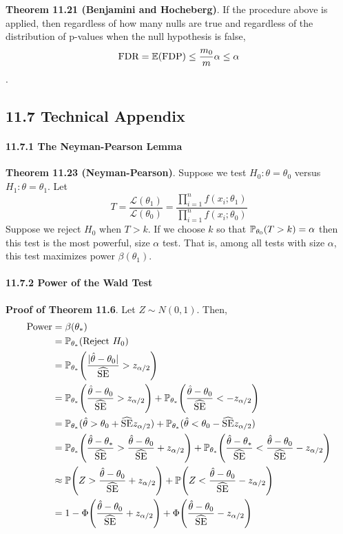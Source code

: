\textbf{Theorem 11.21 (Benjamini and Hocheberg)}. If the procedure above
is applied, then regardless of how many nulls are true and regardless of
the distribution of p-values when the null hypothesis is false,
\[
\text{FDR} = \operatorname{\mathbb{E}}(\text{FDP}) \leq \frac{m_{0}}{m} \alpha \leq \alpha
\].

\subsection*{11.7 Technical Appendix}
\paragraph{11.7.1 The Neyman-Pearson
Lemma}\label{the-neyman-pearson-lemma}

\textbf{Theorem 11.23 (Neyman-Pearson)}. Suppose we test
\(H_{0}: \theta = \theta_{0}\) versus \(H_{1}: \theta = \theta_{1}\). Let
\[
T = \frac{\mathcal{L}(\theta_{1})}{\mathcal{L}(\theta_{0})} = \frac{\prod_{i=1}^{n} f(x_{i}; \theta_{1})}{\prod_{i=1}^{n} f(x_{i}; \theta_{0})}
\]
Suppose we reject \(H_{0}\) when \(T > k\). If we choose \(k\) so that
\(\operatorname{\mathbb{P}}_{\theta_{0}}(T > k) = \alpha\) then this test is the most
powerful, size \(\alpha\) test. That is, among all tests with size
\(\alpha\), this test maximizes power \(\beta(\theta_{1})\).
\paragraph{11.7.2 Power of the Wald Test}\label{power-of-the-wald-test}
\textbf{Proof of Theorem 11.6}.
Let \(Z \sim N(0, 1)\). Then,
\begin{align*}
\text{Power} &= \beta(\theta_{*}) \\
&= \PROB_{\theta_{*}}(\text{Reject } H_{0}) \\
&= \PROB_{\theta_{*}}\left( \frac{|\hat{\theta} - \theta_{0}|}{\widehat{\SE}} > z_{\alpha/2} \right) \\
&= \PROB_{\theta_{*}}\left( \frac{\hat{\theta} - \theta_{0}}{\widehat{\SE}} > z_{\alpha/2} \right) 
+ \PROB_{\theta_{*}}\left( \frac{\hat{\theta} - \theta_{0}}{\widehat{\SE}} < -z_{\alpha/2} \right) \\
&= \PROB_{\theta_{*}}(\hat{\theta} > \theta_{0} + \widehat{\SE} z_{\alpha/2})
+ \PROB_{\theta_{*}}(\hat{\theta} < \theta_{0} - \widehat{\SE} z_{\alpha/2}) \\
&= \PROB_{\theta_{*}}\left( \frac{\hat{\theta} - \theta_{*}}{\widehat{\SE}} > \frac{\hat{\theta} - \theta_{0}}{\widehat{\SE}} + z_{\alpha/2} \right) 
+ \PROB_{\theta_{*}}\left( \frac{\hat{\theta} - \theta_{*}}{\widehat{\SE}} < \frac{\hat{\theta} - \theta_{0}}{\widehat{\SE}} - z_{\alpha/2} \right) \\
& \approx \PROB\left(Z > \frac{\hat{\theta} - \theta_{0}}{\widehat{\SE}} + z_{\alpha/2} \right) 
+ \PROB\left(Z < \frac{\hat{\theta} - \theta_{0}}{\widehat{\SE}} - z_{\alpha/2} \right) \\
&= 1 - \Phi\left( \frac{\hat{\theta} - \theta_{0}}{\widehat{\SE}} + z_{\alpha/2} \right) 
+ \Phi\left( \frac{\hat{\theta} - \theta_{0}}{\widehat{\SE}} - z_{\alpha/2} \right)
\end{align*}
